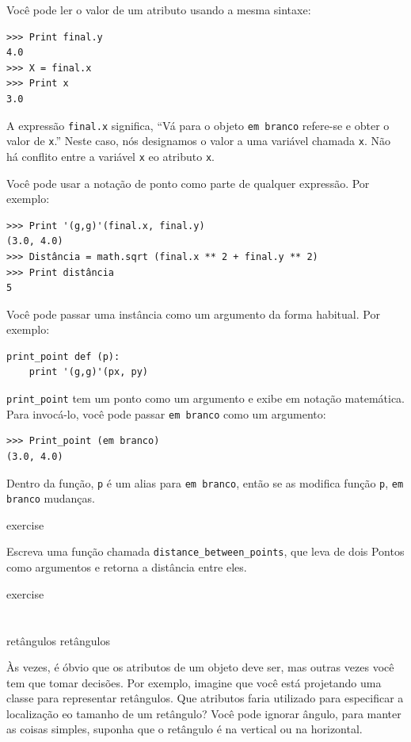 \documentclass[10pt]{book}
\begin{document}
\begin{exercise}
\begin{v erbatim}
{Você pode ler o valor de um atributo usando a mesma sintaxe:

\begin{verbatim}
>>> Print final.y
4.0
>>> X = final.x
>>> Print x
3.0
\end{verbatim}
%
A expressão {\tt final.x} significa, ``Vá para o objeto {\tt em branco}
refere-se e obter o valor de {\tt x}.'' Neste caso, nós designamos o
valor a uma variável chamada {\tt x}. Não há conflito entre
a variável {\tt x} eo atributo {\tt x}.

Você pode usar a notação de ponto como parte de qualquer expressão. Por exemplo:

\begin{verbatim}
>>> Print '(g,g)'(final.x, final.y)
(3.0, 4.0)
>>> Distância = math.sqrt (final.x ** 2 + final.y ** 2)
>>> Print distância
5
\end{verbatim}
%
Você pode passar uma instância como um argumento da forma habitual.
Por exemplo:

\begin{verbatim}
print_point def (p):
    print '(g,g)'(px, py)
\end{verbatim}
%
\Verb "print_point" tem um ponto como um argumento e exibe em
notação matemática. Para invocá-lo, você pode passar {\tt em branco} como
um argumento:

\begin{verbatim}
>>> Print_point (em branco)
(3.0, 4.0)
\end{verbatim}
%
Dentro da função, {\tt p} é um alias para {\tt em branco}, então se
as modifica função {\tt p}, {\tt em branco} mudanças.


\begin{} exercise

Escreva uma função chamada \verb "distance_between_points", que leva de dois
Pontos como argumentos e retorna a distância entre eles.

\end{} exercise



\section{} retângulos
\label{} retângulos

Às vezes, é óbvio que os atributos de um objeto deve ser,
mas outras vezes você tem que tomar decisões. Por exemplo, imagine que você
está projetando uma classe para representar retângulos. Que atributos faria
utilizado para especificar a localização eo tamanho de um retângulo? Você pode
ignorar ângulo, para manter as coisas simples, suponha que o retângulo é
na vertical ou na horizontal.

}
\end{v erbatim}
\end{exercise}
\end{document}
